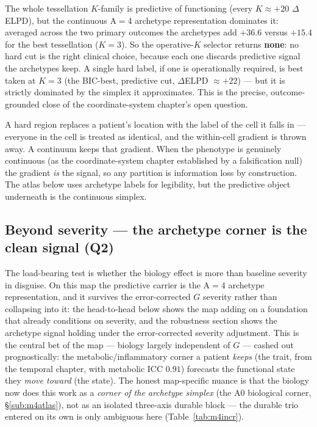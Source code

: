 \begin{keyresult}[Operative $K=$ none --- the continuous/archetype encoding dominates any hard tessellation]
The whole tessellation $K$-family is predictive of functioning (every $K\approx+20$ $\Delta$ELPD), but the
continuous A$=$4 archetype representation dominates it: averaged across the two primary outcomes the
archetypes add $+36.6$ versus $+15.4$ for the best tessellation ($K=3$). So the operative-$K$ selector
returns \textbf{none}: no hard cut is the right clinical choice, because each one discards predictive signal
the archetypes keep. A single hard label, if one is operationally required, is best taken at $K=3$ (the
BIC-best, predictive cut, $\Delta$ELPD $\approx+22$) --- but it is strictly dominated by the simplex it
approximates. This is the precise, outcome-grounded close of the coordinate-system chapter's open question.
\end{keyresult}

\begin{definitionbox}
A hard region replaces a patient's location with the label of the cell it falls in --- everyone in the cell
is treated as identical, and the within-cell gradient is thrown away. A continuum keeps that gradient. When
the phenotype is genuinely continuous (as the coordinate-system chapter established by a falsification null) the
gradient \emph{is} the signal, so any partition is information loss by construction. The atlas below uses
archetype labels for legibility, but the predictive object underneath is the continuous simplex.
\end{definitionbox}

\subsection{Beyond severity --- the archetype corner is the clean signal (Q2)}
The load-bearing test is whether the biology effect is more than baseline severity in disguise. On this map
the predictive carrier is the A$=$4 archetype representation, and it survives the error-corrected $G$
severity rather than collapsing into it: the head-to-head below shows the map adding on a foundation that
already conditions on severity, and the robustness section shows the archetype signal holding under the
error-corrected severity adjustment. This is the central bet of the map --- biology largely independent of
$G$ --- cashed out prognostically: the metabolic/inflammatory corner a patient \emph{keeps} (the trait,
from the temporal chapter, with metabolic ICC $0.91$) forecasts the functional state they \emph{move
toward} (the state). The honest map-specific nuance is that the biology now does this work as a
\emph{corner of the archetype simplex} (the A0 biological corner, \S\ref{sub:m4atlas}), not as an isolated
three-axis durable block --- the durable trio entered on its own is only ambiguous here
(Table~\ref{tab:m4incr}).

